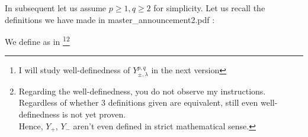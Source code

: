 \documentclass[12pt]{article} %
\theoremstyle{remark}
\newtheorem{remark}{Remark}
\newcommand{\tmverbatim}[1]{ {\ttfamily #1} }
\begin{document}

In subsequent let us assume $p \geqslant 1, q \geqslant 2$ for simplicity. Let
us recall the definitions we have made in
\tmverbatim{master\_announcement2.pdf}:

We define as in \cite{KO2} \footnote{I will study well-definedness of $Y_{\pm, \lambda}^{p, q}$ in the next version}\footnote{Regarding the well-definedness, you do not observe my instructions.\\
Regardless of whether 3 definitions given are equivalent, still 
even 
well-definedness is
not yet proven.\\
Hence, $Y_+$, $Y_-$ aren't even defined in strict 
mathematical sense.}
\end{document}

